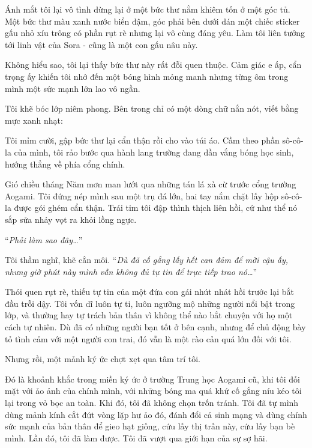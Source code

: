\documentclass[../main.tex]{subfiles}
\begin{document}
\newpage
\label{shino}

Ánh mắt tôi lại vô tình dừng lại ở một bức thư nằm khiêm tốn ở một góc tủ. Một bức thư màu xanh nước biển đậm, góc phải bên dưới dán một chiếc sticker gấu nhỏ xíu trông có phần rụt rè nhưng lại vô cùng đáng yêu. Làm tôi liên tưởng tới linh vật của Sora - cũng là một con gấu nâu này.

Không hiểu sao, tôi lại thấy bức thư này rất đỗi quen thuộc. Cảm giác e ấp, cẩn trọng ấy khiến tôi nhớ đến một bóng hình mỏng manh nhưng từng ôm trong mình một sức mạnh lớn lao vô ngần.

Tôi khẽ bóc lớp niêm phong. Bên trong chỉ có một dòng chữ nắn nót, viết bằng mực xanh nhạt:


Tôi mỉm cười, gập bức thư lại cẩn thận rồi cho vào túi áo. Cầm theo phần sô-cô-la của mình, tôi rảo bước qua hành lang trường đang dần vắng bóng học sinh, hướng thẳng về phía cổng chính.

\ct


Gió chiều tháng Năm mơn man lướt qua những tán lá xà cừ trước cổng trường Aogami. Tôi đứng nép mình sau một trụ đá lớn, hai tay nắm chặt lấy hộp sô-cô-la được gói ghém cẩn thận. Trái tim tôi đập thình thịch liên hồi, cứ như thể nó sắp sửa nhảy vọt ra khỏi lồng ngực.

``\textit{Phải làm sao đây\dots}''

Tôi thầm nghĩ, khẽ cắn môi. ``\textit{Dù đã cố gắng lấy hết can đảm để mời cậu ấy, nhưng giờ phút này mình vẫn không đủ tự tin để trực tiếp trao nó\dots}''

Thói quen rụt rè, thiếu tự tin của một đứa con gái nhút nhát hồi trước lại bắt đầu trỗi dậy. Tôi vốn dĩ luôn tự ti, luôn ngưỡng mộ những người nổi bật trong lớp, và thường hay tự trách bản thân vì không thể nào bắt chuyện với họ một cách tự nhiên. Dù đã có những người bạn tốt ở bên cạnh, nhưng để chủ động bày tỏ tình cảm với một người con trai, đó vẫn là một rào cản quá lớn đối với tôi.

Nhưng rồi, một mảnh ký ức chợt xẹt qua tâm trí tôi.

Đó là khoảnh khắc trong miền ký ức ở trường Trung học Aogami cũ, khi tôi đối mặt với ảo ảnh của chính mình, với những bóng ma quá khứ cố gắng níu kéo tôi lại trong vỏ bọc an toàn. Khi đó, tôi đã không chọn trốn tránh. Tôi đã tự mình dùng mảnh kính cắt đứt vòng lặp hư ảo đó, đánh đổi cả sinh mạng và dùng chính sức mạnh của bản thân để gieo hạt giống, cứu lấy thị trấn này, cứu lấy bạn bè mình. Lần đó, tôi đã làm được. Tôi đã vượt qua giới hạn của sự sợ hãi.
\end{document}
